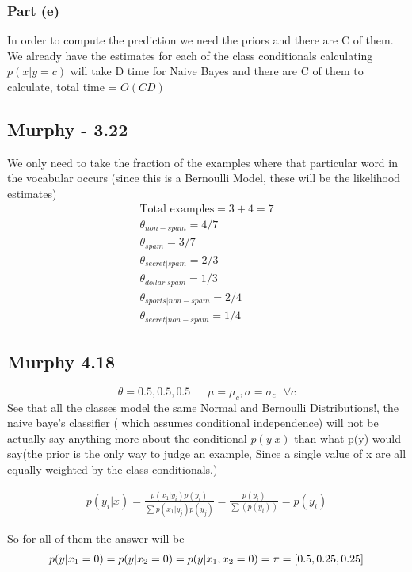 \subsubsection{Part (e)}
In order to compute the prediction we need the priors and there are C of them. We already have the estimates for each of the class conditionals
calculating $p(x | y = c)$ will take D time for Naive Bayes  and there are C of them to calculate, 
total time = $O(CD)$

\subsection{Murphy - 3.22}
We only need to take the fraction of the examples where that particular word in the vocabular occurs  (since this is a Bernoulli Model, these will be the likelihood estimates)
\begin{gather}
    \text{Total examples} = 3 + 4 = 7\\
    \theta_{non-spam} = 4/7\\
    \theta_{spam} = 3/7\\
    \theta_{secret | spam} = 2/3\\
    \theta_{dollar| spam} = 1/3\\
    \theta_{sports | non-spam} = 2/4\\
    \theta_{secret| non-spam} = 1/4
\end{gather}
\subsection{Murphy 4.18}
 $$\theta = 0.5, 0.5 , 0.5 \ \ \ \ \ \ \ \mu  = \mu_c , \sigma  = \sigma_c   \ \ \ \forall c $$
See that all the classes model the same Normal and Bernoulli Distributions!, the naive baye's classifier ( which assumes conditional independence) will not be actually say anything more about the conditional $p(y|x)$ than what p(y) would say(the prior is the only way to judge an example, 
Since a single value of x are all equally weighted by the class conditionals.)

\begin{gather}
    p(y_i|x) =  \frac{p(x_1|y_i)p(y_i)}{\sum p(x_1|y_j)p(y_j)} = \frac{p(y_i)}{\sum(p(y_i))} = p(y_i)
\end{gather}

So for all of them the answer will be
\begin{gather}
    p(y |x_1 = 0) = p(y | x_2 = 0) = p(y | x_1,x_2 = 0) =  \vb{\pi} = [0.5, 0.25, 0.25]
\end{gather}
